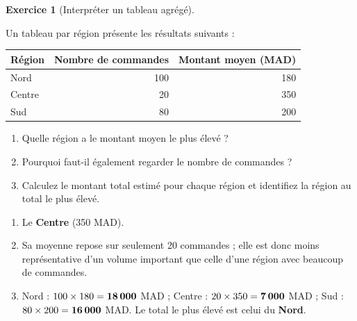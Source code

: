 \documentclass[
  french,
  letterpaper,
  open=any]{scrbook}
\newcounter{none} %
\providecommand{\tightlist}{%
  \setlength{\itemsep}{0pt}\setlength{\parskip}{0pt}}
\theoremstyle{definition}
\theoremstyle{definition}
\newtheorem{exercise}{Exercice}[section]
\theoremstyle{remark}
\begin{document}
\begin{exercise}[Interpréter un tableau
agrégé]\protect\hypertarget{exr-eda-8}{}\label{exr-eda-8}

Un tableau par région présente les résultats suivants :

{\def\LTcaptype{none} %
\begin{longtable}[]{@{}lrr@{}}
\toprule\noalign{}
Région & Nombre de commandes & Montant moyen (MAD) \\
\midrule\noalign{}
\endhead
\bottomrule\noalign{}
\endlastfoot
Nord & 100 & 180 \\
Centre & 20 & 350 \\
Sud & 80 & 200 \\
\end{longtable}
}

\begin{enumerate}
\def\labelenumi{\alph{enumi}.}
\tightlist
\item
  Quelle région a le montant moyen le plus élevé ?
\item
  Pourquoi faut-il également regarder le nombre de commandes ?
\item
  Calculez le montant total estimé pour chaque région et identifiez la
  région au total le plus élevé.
\end{enumerate}

\end{exercise}

\begin{tcolorbox}[enhanced jigsaw, arc=.35mm, bottomrule=.15mm, bottomtitle=1mm, breakable, colback=white, colbacktitle=quarto-callout-tip-color!10!white, colframe=quarto-callout-tip-color-frame, coltitle=black, left=2mm, leftrule=.75mm, opacityback=0, opacitybacktitle=0.6, rightrule=.15mm, title=\textcolor{quarto-callout-tip-color}{\faLightbulb}\hspace{0.5em}{Solution de l'exercice Exercice~\ref{exr-eda-8}}, titlerule=0mm, toprule=.15mm, toptitle=1mm]

\begin{enumerate}
\def\labelenumi{\alph{enumi}.}
\tightlist
\item
  Le \textbf{Centre} (350 MAD).
\item
  Sa moyenne repose sur seulement 20 commandes ; elle est donc moins
  représentative d'un volume important que celle d'une région avec
  beaucoup de commandes.
\item
  Nord : \(100\times180=\textbf{18\,000}\) MAD ; Centre :
  \(20\times350=\textbf{7\,000}\) MAD ; Sud :
  \(80\times200=\textbf{16\,000}\) MAD. Le total le plus élevé est celui
  du \textbf{Nord}.
\end{enumerate}

\end{tcolorbox}
\end{document}
